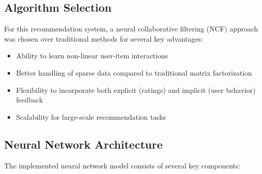 \documentclass[12pt]{article}
\begin{document}
\subsection{Algorithm Selection}
For this recommendation system, a neural collaborative filtering (NCF) approach was chosen over traditional methods for several key advantages:
\begin{itemize}
    \item Ability to learn non-linear user-item interactions
    \item Better handling of sparse data compared to traditional matrix factorization
    \item Flexibility to incorporate both explicit (ratings) and implicit (user behavior) feedback
    \item Scalability for large-scale recommendation tasks
\end{itemize}

\subsection{Neural Network Architecture}
The implemented neural network model consists of several key components:
\end{document}
